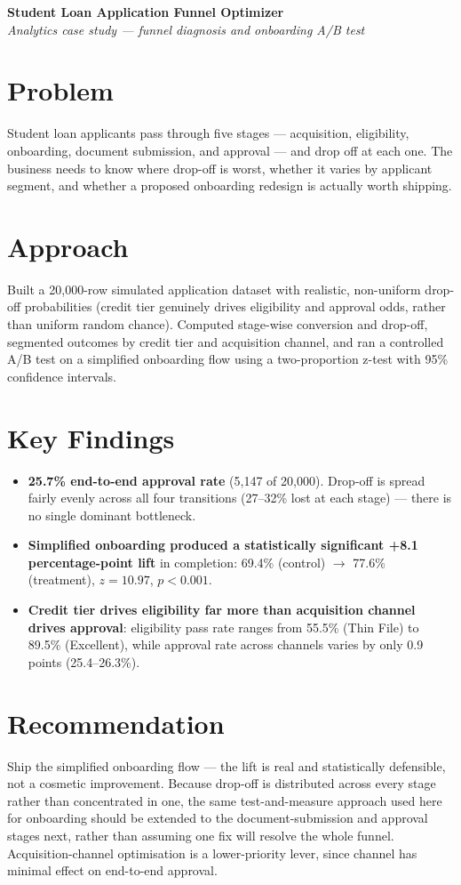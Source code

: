 \documentclass[10pt]{article}
\begin{document}
{\LARGE \textbf{\color{DeepBlue} Student Loan Application Funnel Optimizer}}\\
\textit{Analytics case study --- funnel diagnosis and onboarding A/B test}

\section*{Problem}
Student loan applicants pass through five stages --- acquisition, eligibility, onboarding, document submission, and approval --- and drop off at each one. The business needs to know where drop-off is worst, whether it varies by applicant segment, and whether a proposed onboarding redesign is actually worth shipping.

\section*{Approach}
Built a 20,000-row simulated application dataset with realistic, non-uniform drop-off probabilities (credit tier genuinely drives eligibility and approval odds, rather than uniform random chance). Computed stage-wise conversion and drop-off, segmented outcomes by credit tier and acquisition channel, and ran a controlled A/B test on a simplified onboarding flow using a two-proportion z-test with 95\% confidence intervals.

\section*{Key Findings}
\begin{itemize}[leftmargin=16pt, itemsep=4pt]
\item \textbf{25.7\% end-to-end approval rate} (5,147 of 20,000). Drop-off is spread fairly evenly across all four transitions (27--32\% lost at each stage) --- there is no single dominant bottleneck.
\item \textbf{Simplified onboarding produced a statistically significant +8.1 percentage-point lift} in completion: 69.4\% (control) $\rightarrow$ 77.6\% (treatment), $z=10.97$, $p<0.001$.
\item \textbf{Credit tier drives eligibility far more than acquisition channel drives approval}: eligibility pass rate ranges from 55.5\% (Thin File) to 89.5\% (Excellent), while approval rate across channels varies by only 0.9 points (25.4--26.3\%).
\end{itemize}

\section*{Recommendation}
Ship the simplified onboarding flow --- the lift is real and statistically defensible, not a cosmetic improvement. Because drop-off is distributed across every stage rather than concentrated in one, the same test-and-measure approach used here for onboarding should be extended to the document-submission and approval stages next, rather than assuming one fix will resolve the whole funnel. Acquisition-channel optimisation is a lower-priority lever, since channel has minimal effect on end-to-end approval.
\end{document}
